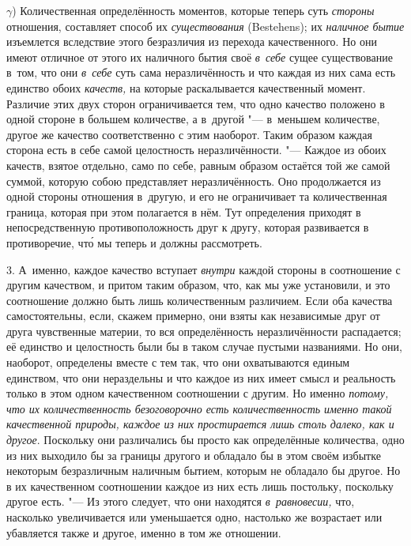$\gamma$) Количественная определённость моментов, которые теперь суть
{\em стороны} отношения, составляет способ их {\em существования} (Be\-ste\-hens);
их {\em наличное бытие} изъемлется вследствие этого безразличия из перехода
качественного. Но они имеют отличное от этого их наличного бытия своё
{\em в~себе} сущее существование в~том, что они {\em в~себе} суть сама
неразличённость и что каждая из них сама есть единство обоих {\em качеств,} на
которые раскалывается качественный момент. Различие этих двух сторон
ограничивается тем, что одно качество положено в одной стороне в большем
количестве, а в~другой "--- в~меньшем количестве, другое же качество
соответственно с этим наоборот. Таким образом каждая сторона есть в себе самой
целостность неразличённости. "--- Каждое из обоих качеств, взятое отдельно,
само по себе, равным образом остаётся той же самой суммой, которую собою
представляет неразличённость. Оно продолжается из одной стороны отношения
в~другую, и его не ограничивает та количественная граница, которая при этом
полагается в нём. Тут определения приходят в непосредственную противоположность
друг к другу, которая развивается в противоречие, чт\'{о} мы теперь и должны
рассмотреть.

3. А~именно, каждое качество вступает {\em внутри} каждой стороны в соотношение
с другим качеством, и притом таким образом, что, как мы уже установили, и это
соотношение должно быть лишь количественным различием. Если оба качества
самостоятельны, если, скажем примерно, они взяты как независимые друг от друга
чувственные материи, то вся определённость неразличённости распадается; её
единство и целостность были бы в таком случае пустыми названиями. Но они,
наоборот, определены вместе с тем так, что они охватываются единым единством,
что они нераздельны и что каждое из них имеет смысл и реальность только в этом
одном качественном соотношении с другим. Но именно {\em потому, что их
количественность безоговорочно есть количественность именно такой качественной
природы, каждое из них простирается лишь столь далеко, как и другое}. Поскольку
они различались бы просто как определённые количества, одно из них выходило бы
за границы другого и обладало бы в этом своём избытке некоторым безразличным
наличным бытием, которым не обладало бы другое. Но в их качественном
соотношении каждое из них есть лишь постольку, поскольку другое есть. "--- Из
этого следует, что они находятся {\em в~равновесии,} что, насколько
увеличивается или уменьшается одно, настолько же возрастает или убавляется
также и другое, именно в том же отношении.

